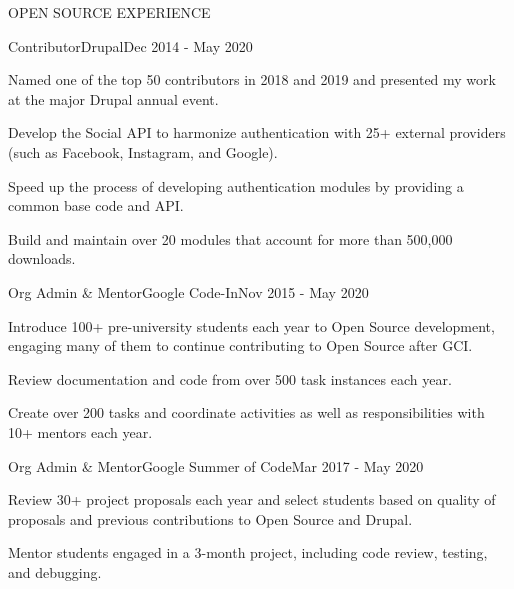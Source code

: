 \documentclass{resume} %
\begin{document}

\begin{rSection}{OPEN SOURCE EXPERIENCE}

\begin{rSubsection}{Contributor}{Drupal}{}{Dec 2014 - May 2020}
\item Named one of the top 50 contributors in 2018 and 2019 and presented my work at the major Drupal annual event.
\item Develop the Social API to harmonize authentication with 25+ external providers (such as Facebook, Instagram, and Google).
\item Speed up the process of developing authentication modules by providing a common base code and API.
\item Build and maintain over 20 modules that account for more than 500,000 downloads.
\end{rSubsection}


\begin{rSubsection}{Org Admin \& Mentor}{Google Code-In}{}{Nov 2015 - May 2020}
\item Introduce 100+ pre-university students each year to Open Source development, engaging many of them to continue contributing to Open Source after GCI.
\item Review documentation and code from over 500 task instances each year.
\item Create over 200 tasks and coordinate activities as well as responsibilities with 10+ mentors each year.
\end{rSubsection}


\begin{rSubsection}{Org Admin \& Mentor}{Google Summer of Code}{}{Mar 2017 - May 2020}
\item Review 30+ project proposals each year and select students based on quality of proposals and previous contributions to Open Source and Drupal.
\item Mentor students engaged in a 3-month project, including code review, testing, and debugging.
\end{rSubsection}

\end{rSection}





\end{document}

